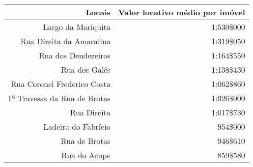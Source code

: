 \begin{table}[!htp]
{
\begin{tabular}{rr}
\hline
Locais	&Valor locativo médio por imóvel\\
\hline
\hline
Largo da Mariquita	&1:530\$000\\
Rua Direita da Amaralina	&1:319\$050\\
Rua dos Dendezeiros	&1:164\$550\\
Rua dos Galés	&1:138\$430\\
Rua Coronel Frederico Costa	&1:062\$860\\
1ª Travessa da Rua de Brotas	&1:026\$000\\
Rua Direita	&1:017\$730\\
Ladeira do Fabrício	&954\$000\\
Rua de Brotas	&946\$610\\
Rua do Acupe	&859\$580\\
\hline
\end{tabular} 
}
{}
\end{table}

